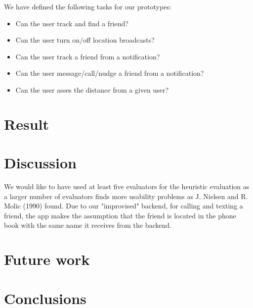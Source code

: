 \documentclass[runningheads,a4paper]{llncs}
\begin{document}
We  have defined the following tasks for our prototypes:\\
\begin{itemize}
\item Can the user track and find a friend? 
\item Can the user turn on/off location broadcasts? 
\item Can the user track a friend from a notification?
\item Can the user message/call/nudge a friend from a notification?
\item Can the user asses the distance from a given user?
\end{itemize}

\section{Result}
\section{Discussion}
We would like to have used at least five evaluators for the heuristic evaluation as a larger number of evaluators finds more usability problems as J. Nielsen and R. Molic (1990) found.\cite{heuristics}
Due to our "improvised" backend, for calling and texting a friend, the app makes the assumption that the friend is located in the phone book with the same name it receives from the backend. 
\section{Future work}
\section{Conclusions}
\end{document}
